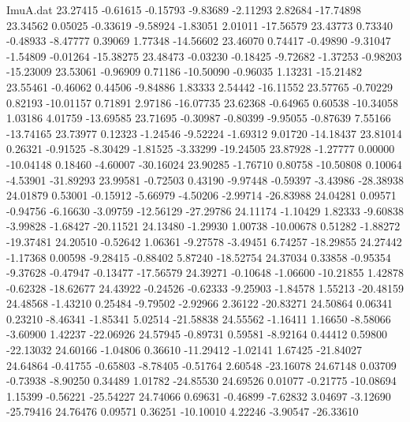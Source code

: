 \begin{filecontents}{ImuA.dat}
  23.27415   -0.61615   -0.15793   -9.83689   -2.11293    2.82684  -17.74898
  23.34562    0.05025   -0.33619   -9.58924   -1.83051    2.01011  -17.56579
  23.43773    0.73340   -0.48933   -8.47777    0.39069    1.77348  -14.56602
  23.46070    0.74417   -0.49890   -9.31047   -1.54809   -0.01264  -15.38275
  23.48473   -0.03230   -0.18425   -9.72682   -1.37253   -0.98203  -15.23009
  23.53061   -0.96909    0.71186  -10.50090   -0.96035    1.13231  -15.21482
  23.55461   -0.46062    0.44506   -9.84886    1.83333    2.54442  -16.11552
  23.57765   -0.70229    0.82193  -10.01157    0.71891    2.97186  -16.07735
  23.62368   -0.64965    0.60538  -10.34058    1.03186    4.01759  -13.69585
  23.71695   -0.30987   -0.80399   -9.95055   -0.87639    7.55166  -13.74165
  23.73977    0.12323   -1.24546   -9.52224   -1.69312    9.01720  -14.18437
  23.81014    0.26321   -0.91525   -8.30429   -1.81525   -3.33299  -19.24505
  23.87928   -1.27777    0.00000  -10.04148    0.18460   -4.60007  -30.16024
  23.90285   -1.76710    0.80758  -10.50808    0.10064   -4.53901  -31.89293
  23.99581   -0.72503    0.43190   -9.97448   -0.59397   -3.43986  -28.38938
  24.01879    0.53001   -0.15912   -5.66979   -4.50206   -2.99714  -26.83988
  24.04281    0.09571   -0.94756   -6.16630   -3.09759  -12.56129  -27.29786
  24.11174   -1.10429    1.82333   -9.60838   -3.99828   -1.68427  -20.11521
  24.13480   -1.29930    1.00738  -10.00678    0.51282   -1.88272  -19.37481
  24.20510   -0.52642    1.06361   -9.27578   -3.49451    6.74257  -18.29855
  24.27442   -1.17368    0.00598   -9.28415   -0.88402    5.87240  -18.52754
  24.37034    0.33858   -0.95354   -9.37628   -0.47947   -0.13477  -17.56579
  24.39271   -0.10648   -1.06600  -10.21855    1.42878   -0.62328  -18.62677
  24.43922   -0.24526   -0.62333   -9.25903   -1.84578    1.55213  -20.48159
  24.48568   -1.43210    0.25484   -9.79502   -2.92966    2.36122  -20.83271
  24.50864    0.06341    0.23210   -8.46341   -1.85341    5.02514  -21.58838
  24.55562   -1.16411    1.16650   -8.58066   -3.60900    1.42237  -22.06926
  24.57945   -0.89731    0.59581   -8.92164    0.44412    0.59800  -22.13032
  24.60166   -1.04806    0.36610  -11.29412   -1.02141    1.67425  -21.84027
  24.64864   -0.41755   -0.65803   -8.78405   -0.51764    2.60548  -23.16078
  24.67148    0.03709   -0.73938   -8.90250    0.34489    1.01782  -24.85530
  24.69526    0.01077   -0.21775  -10.08694    1.15399   -0.56221  -25.54227
  24.74066    0.69631   -0.46899   -7.62832    3.04697   -3.12690  -25.79416
  24.76476    0.09571    0.36251  -10.10010    4.22246   -3.90547  -26.33610

\end{filecontents}
